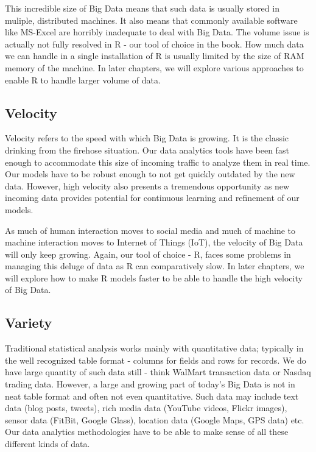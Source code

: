\documentclass[11pt, letterpaper, twoside]{memoir}\usepackage{knitr}
\begin{document}
This incredible size of Big Data means that such data is usually stored in muliple, distributed machines. It also means that commonly available software like MS-Excel are horribly inadequate to deal with Big Data. The volume issue is actually not fully resolved in R - our tool of choice in the book. How much data we can handle in a single installation of R is usually limited by the size of RAM memory of the machine. In later chapters, we will explore various approaches to enable R to handle larger volume of data.

\subsection{Velocity}

Velocity refers to the speed with which Big Data is growing. It is the classic drinking from the firehose situation. Our data analytics tools have been fast enough to accommodate this size of incoming traffic to analyze them in real time. Our models have to be robust enough to not get quickly outdated by the new data. However, high velocity also presents a tremendous opportunity as new incoming data provides potential for continuous learning and refinement of our models.

As much of human interaction moves to social media and much of machine to machine interaction moves to Internet of Things (IoT), the velocity of Big Data will only keep growing. Again, our tool of choice - R, faces some problems in managing this deluge of data as R can comparatively slow. In later chapters, we will explore how to make R models faster to be able to handle the high velocity of Big Data.

\subsection{Variety}

Traditional statistical analysis works mainly with quantitative data; typically in the well recognized table format - columns for fields and rows for records. We do have large quantity of such data still - think WalMart transaction data or Nasdaq trading data. However, a large and growing part of today's Big Data is not in neat table format and often not even quantitative. Such data may include text data (blog posts, tweets), rich media data (YouTube videos, Flickr images), sensor data (FitBit, Google Glass), location data (Google Maps, GPS data) etc. Our data analytics methodologies have to be able to make sense of all these different kinds of data.
\end{document}
